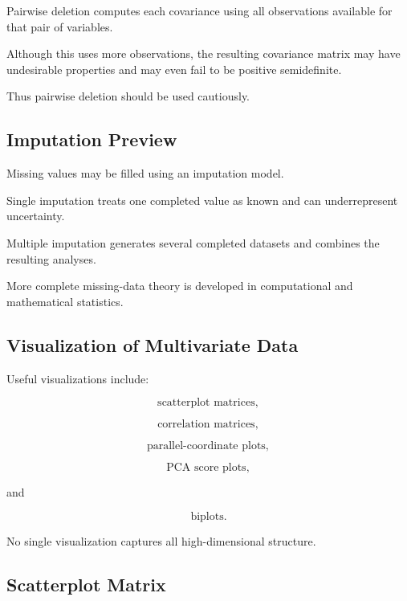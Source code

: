 Pairwise deletion computes each covariance using all observations
available for that pair of variables.

Although this uses more observations, the resulting covariance matrix may
have undesirable properties and may even fail to be positive
semidefinite.

Thus pairwise deletion should be used cautiously.

\subsection{Imputation Preview}
\label{subsec:multivariate-imputation-preview}

Missing values may be filled using an imputation model.

Single imputation treats one completed value as known and can
underrepresent uncertainty.

Multiple imputation generates several completed datasets and combines the
resulting analyses.

More complete missing-data theory is developed in computational and
mathematical statistics.

\subsection{Visualization of Multivariate Data}
\label{subsec:multivariate-visualization}

Useful visualizations include:

\[
\boxed{
\text{scatterplot matrices},
}
\]

\[
\boxed{
\text{correlation matrices},
}
\]

\[
\boxed{
\text{parallel-coordinate plots},
}
\]

\[
\boxed{
\text{PCA score plots},
}
\]

and

\[
\boxed{
\text{biplots}.
}
\]

No single visualization captures all high-dimensional structure.

\subsection{Scatterplot Matrix}
\label{subsec:scatterplot-matrix}


